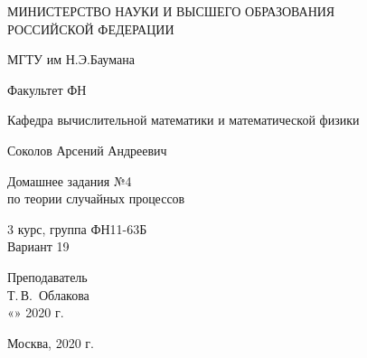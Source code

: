 \documentclass[14pt,a4paper]{scrartcl}
\begin{document}
	\begin{titlepage}
	\begin{center}
		\large
		МИНИСТЕРСТВО НАУКИ И ВЫСШЕГО ОБРАЗОВАНИЯ\\ РОССИЙСКОЙ ФЕДЕРАЦИИ
		
		\vspace{0.5cm}
		
		МГТУ им Н.Э.Баумана
		\vspace{0.25cm}
		
		Факультет ФН
		
		Кафедра вычислительной математики и математической физики
		\vfill
		
		
		Соколов Арсений Андреевич\\
		\vfill
		
		
		{\LARGE Домашнее задания №4 \\ по теории случайных процессов\\[2mm]
		}
		\bigskip
		
		3 курс, группа ФН11-63Б\\
		Вариант 19
	\end{center}
	\vfill
	
	\newlength{\ML}
	\hfill\begin{minipage}{0.4\textwidth}
		Преподаватель\\
		\underline{\hspace{3cm}} Т.\,В.~Облакова\\
		«\underline{\hspace{0.7cm}}» \underline{\hspace{1.71cm}} 2020 г.
	\end{minipage}%
	\bigskip
	
	
	\vfill
	
	\begin{center}
		Москва, 2020 г.
	\end{center}
\end{titlepage}

\tableofcontents
\pagebreak
\end{document}
